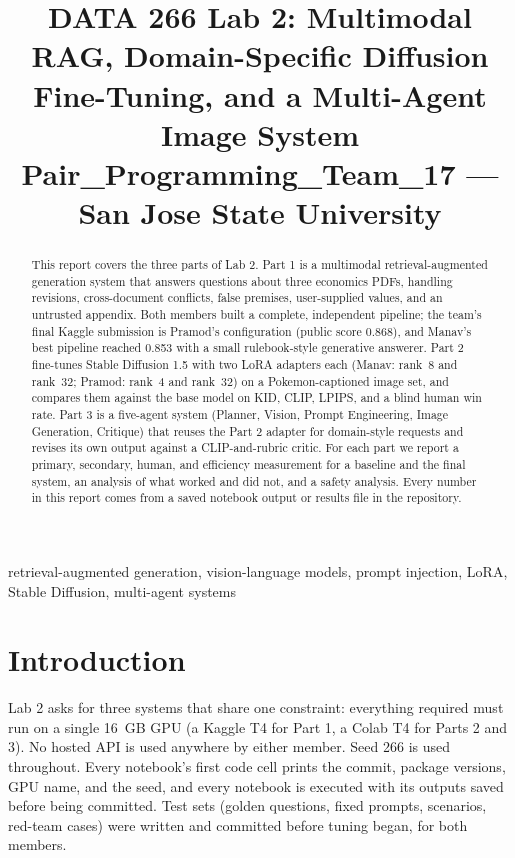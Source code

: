\documentclass[conference,10pt]{IEEEtran}
\begin{document}
\title{DATA 266 Lab 2: Multimodal RAG, Domain-Specific Diffusion Fine-Tuning, and a Multi-Agent Image System\\[4pt]
\large Pair\_Programming\_Team\_17 --- San Jose State University}

\author{}

\maketitle

\begin{abstract}
This report covers the three parts of Lab 2. Part 1 is a multimodal retrieval-augmented generation
system that answers questions about three economics PDFs, handling revisions, cross-document
conflicts, false premises, user-supplied values, and an untrusted appendix. Both members built a
complete, independent pipeline; the team's final Kaggle submission is Pramod's configuration (public
score 0.868), and Manav's best pipeline reached 0.853 with a small rulebook-style generative
answerer. Part 2 fine-tunes Stable Diffusion 1.5 with two LoRA adapters each (Manav: rank~8 and
rank~32; Pramod: rank~4 and rank~32) on a Pokemon-captioned image set, and compares them against
the base model on KID, CLIP, LPIPS, and a blind human win rate. Part 3 is a five-agent system
(Planner, Vision, Prompt Engineering, Image Generation, Critique) that reuses the Part 2 adapter for
domain-style requests and revises its own output against a CLIP-and-rubric critic. For each part we
report a primary, secondary, human, and efficiency measurement for a baseline and the final system,
an analysis of what worked and did not, and a safety analysis. Every number in this report comes
from a saved notebook output or results file in the repository.
\end{abstract}

\begin{IEEEkeywords}
retrieval-augmented generation, vision-language models, prompt injection, LoRA, Stable Diffusion,
multi-agent systems
\end{IEEEkeywords}

\section{Introduction}

Lab 2 asks for three systems that share one constraint: everything required must run on a single
16~GB GPU (a Kaggle T4 for Part 1, a Colab T4 for Parts 2 and 3). No hosted API is used anywhere by
either member. Seed 266 is used throughout. Every notebook's first code cell prints the commit,
package versions, GPU name, and the seed, and every notebook is executed with its outputs saved
before being committed. Test sets (golden questions, fixed prompts, scenarios, red-team cases) were
written and committed before tuning began, for both members.
\end{document}
